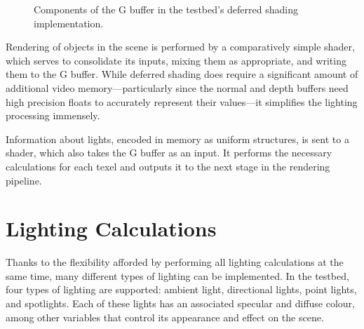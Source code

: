 \documentclass[11pt, oneside]{report}
\begin{document}
\begin{figure}[!htbp]
  \centering
  \hfill
  \hfill
  \caption{Components of the G buffer in the testbed's deferred shading implementation.}
\end{figure}

Rendering of objects in the scene is performed by a comparatively simple \gls{shader}, which serves to consolidate its inputs, mixing them as appropriate, and writing them to the G buffer. While deferred shading does require a significant amount of additional video memory---particularly since the normal and depth buffers need high precision \glspl{float} to accurately represent their values---it simplifies the lighting processing immensely.

Information about lights, encoded in memory as uniform structures, is sent to a shader, which also takes the G buffer as an input. It performs the necessary calculations for each \gls{texel} and outputs it to the next stage in the rendering pipeline.

\section{Lighting Calculations}
Thanks to the flexibility afforded by performing all lighting calculations at the same time, many different types of lighting can be implemented. In the testbed, four types of lighting are supported: ambient light, directional lights, point lights, and spotlights. Each of these lights has an associated \gls{specular} and \gls{diffuse} colour, among other variables that control its appearance and effect on the scene.
\end{document}
